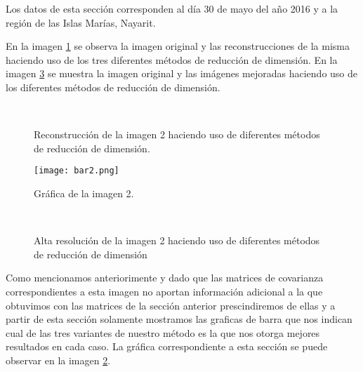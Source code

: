 Los datos de esta sección corresponden al día 30 de mayo del año 2016 y a la región de las Islas Marías, Nayarit. 

En la imagen \ref{rec2} se observa la imagen original y las reconstrucciones de la misma haciendo uso de los tres diferentes métodos de reducción de dimensión. En la imagen \ref{ar2} se muestra la imagen original y las imágenes mejoradas haciendo uso de los diferentes métodos de reducción de dimensión. 

\begin{figure}[!tbp]
  \centering
  \qquad
  \qquad
  \\
  \caption{Reconstrucción de la imagen 2 haciendo uso de diferentes métodos de reducción de dimensión.}
  \label{rec2}
\end{figure}


\begin{figure}
\centering
\texttt{[image: bar2.png]}
\caption{Gráfica de la imagen 2.}
\label{bar2}
\end{figure}

\begin{figure}[!tbp]
  \centering
  \qquad
  \qquad
  \\
  \caption{Alta resolución de la imagen 2 haciendo uso de diferentes métodos de reducción de dimensión}
  \label{ar2}
\end{figure}

Como mencionamos anteriorimente y dado que las matrices de covarianza correspondientes a esta imagen no aportan información adicional a la que obtuvimos con las matrices de la sección anterior prescindiremos de ellas y a partir de esta sección solamente mostramos las graficas de barra que nos indican cual de las tres variantes de nuestro método es la que nos otorga mejores resultados en cada caso. La gráfica correspondiente a esta sección se puede observar en la imagen \ref{bar2}.  



